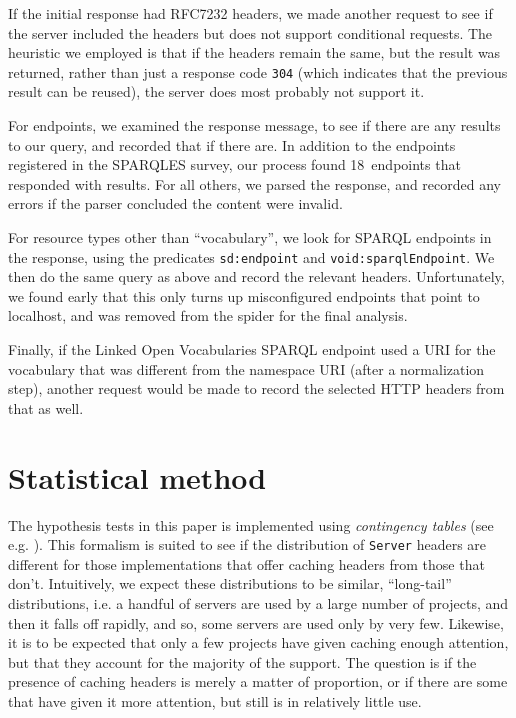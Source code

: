 \documentclass{article}
\newcommand{\rdfterm}[1]{\texttt{#1}}
\newcommand{\httph}[1]{\texttt{#1}}
\begin{document}
If the initial response had RFC7232 headers, we made another
request to see if the server included the headers but does not
support conditional requests. The heuristic we employed is
that if the headers remain the same, but the result was returned,
rather than just a response code \httph{304} (which indicates that the
previous result can be reused), the server does most probably not
support it.

For endpoints, we examined the response message, to see if there are
any results to our query, and recorded that if there are. In addition
to the endpoints registered in the SPARQLES survey, our process found
18~endpoints that responded with results. For all others, we parsed
the response, and recorded any errors if the parser concluded the
content were invalid.

For resource types other than ``vocabulary'', we look for SPARQL
endpoints in the response, using the predicates \rdfterm{sd:endpoint}
and \rdfterm{void:sparqlEndpoint}. We then do the same query as above
and record the relevant headers. Unfortunately, we found early that
this only turns up misconfigured endpoints that point to localhost,
and was removed from the spider for the final analysis.

Finally, if the Linked Open Vocabularies \cite{lov2} SPARQL endpoint
used a URI for the vocabulary that was different from the namespace
URI (after a normalization step), another request would be made to
record the selected HTTP headers from that as well.

\section{Statistical method}\label{app:stats}

The hypothesis tests in this paper is implemented using \emph{contingency
  tables} (see e.g. \cite{kn:bj}). This formalism is suited to see if the
distribution of  \httph{Server} headers are different for those implementations that
offer caching headers from those that don't. Intuitively, we expect
these distributions to be similar, ``long-tail'' distributions, i.e. a
handful of servers are used by a large number of projects, and then it
falls off rapidly, and so, some servers are used only by very
few. Likewise, it is to be expected that only a few projects have
given caching enough attention, but that they account for the majority
of the support. The question is if the presence of caching headers is
merely a matter of proportion, or if there are some that have given it
more attention, but still is in relatively little use.
\end{document}
